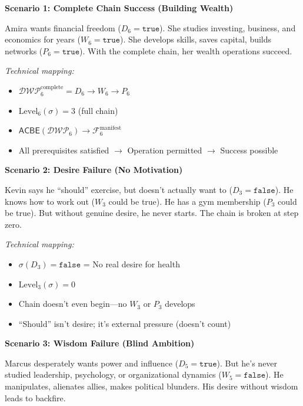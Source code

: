 \documentclass[11pt,twoside]{book}
\newcommand{\Foundations}{\mathcal{F}}
\newcommand{\ACBE}{\mathsf{ACBE}}
\newcommand{\DWP}{\mathcal{DWP}}
\begin{document}
\begin{tcolorbox}[colback=yellow!5!white,colframe=yellow!65!black,title=\textbf{Real-Life Scenarios: D/W/P Chains},breakable]

\textbf{Scenario 1: Complete Chain Success (Building Wealth)}

Amira wants financial freedom ($D_6 = \mathtt{true}$). She studies investing, business, and economics for years ($W_6 = \mathtt{true}$). She develops skills, saves capital, builds networks ($P_6 = \mathtt{true}$). With the complete chain, her wealth operations succeed.

\textit{Technical mapping:}
\begin{itemize}
    \item $\DWP_6^{\mathrm{complete}} = D_6 \to W_6 \to P_6$
    \item $\mathrm{Level}_6(\sigma) = 3$ (full chain)
    \item $\ACBE(\DWP_6) \to \Foundations_6^{\mathrm{manifest}}$
    \item All prerequisites satisfied $\to$ Operation permitted $\to$ Success possible
\end{itemize}

\textbf{Scenario 2: Desire Failure (No Motivation)}

Kevin says he ``should'' exercise, but doesn't actually want to ($D_3 = \mathtt{false}$). He knows how to work out ($W_3$ could be true). He has a gym membership ($P_3$ could be true). But without genuine desire, he never starts. The chain is broken at step zero.

\textit{Technical mapping:}
\begin{itemize}
    \item $\sigma(D_3) = \mathtt{false}$ = No real desire for health
    \item $\mathrm{Level}_3(\sigma) = 0$
    \item Chain doesn't even begin---no $W_3$ or $P_3$ develops
    \item ``Should'' isn't desire; it's external pressure (doesn't count)
\end{itemize}

\textbf{Scenario 3: Wisdom Failure (Blind Ambition)}

Marcus desperately wants power and influence ($D_5 = \mathtt{true}$). But he's never studied leadership, psychology, or organizational dynamics ($W_5 = \mathtt{false}$). He manipulates, alienates allies, makes political blunders. His desire without wisdom leads to backfire.


\end{tcolorbox}
\end{document}
